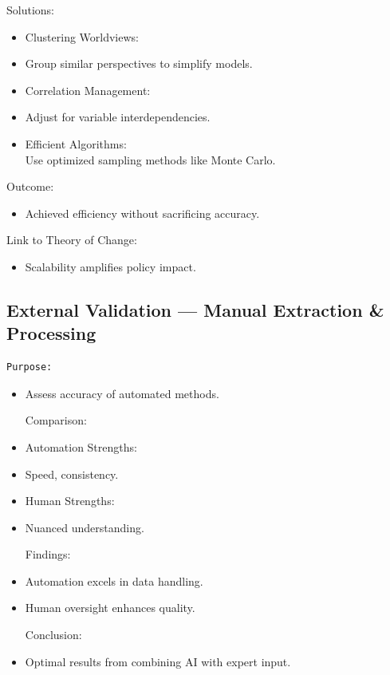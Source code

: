 \documentclass[
  letterpaper,
]{book}
\providecommand{\tightlist}{%
  \setlength{\itemsep}{0pt}\setlength{\parskip}{0pt}}
\begin{document}
Solutions:

\begin{itemize}
\tightlist
\item
  Clustering Worldviews:\\
\item
  Group similar perspectives to simplify models.\\
\item
  Correlation Management:\\
\item
  Adjust for variable interdependencies.\\
\item
  Efficient Algorithms:\\
  Use optimized sampling methods like Monte Carlo.
\end{itemize}

Outcome:

\begin{itemize}
\tightlist
\item
  Achieved efficiency without sacrificing accuracy.
\end{itemize}

Link to Theory of Change:

\begin{itemize}
\tightlist
\item
  Scalability amplifies policy impact.
\end{itemize}

\subsection{External Validation --- Manual Extraction \&
Processing}\label{external-validation-manual-extraction-processing}

\begin{verbatim}
Purpose:
\end{verbatim}

\begin{itemize}
\item
  Assess accuracy of automated methods.

  Comparison:
\item
  Automation Strengths:\\
\item
  Speed, consistency.\\
\item
  Human Strengths:\\
\item
  Nuanced understanding.

  Findings:
\item
  Automation excels in data handling.\\
\item
  Human oversight enhances quality.

  Conclusion:
\item
  Optimal results from combining AI with expert input.
\end{itemize}
\end{document}
